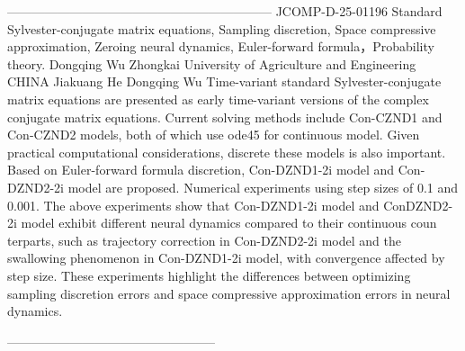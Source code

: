 ---------------------------------------------------------------
JCOMP-D-25-01196
Standard Sylvester-conjugate matrix equations, Sampling discretion, Space
compressive approximation, Zeroing
neural dynamics, Euler-forward formula，Probability theory.
Dongqing Wu
Zhongkai University of Agriculture and Engineering
CHINA
Jiakuang He
Dongqing Wu
Time-variant standard Sylvester-conjugate matrix equations are presented as early
time-variant versions of the complex conjugate matrix equations. Current solving
methods include Con-CZND1 and Con-CZND2 models, both of which use ode45 for
continuous model. Given practical computational considerations, discrete these models
is also important. Based on Euler-forward formula discretion, Con-DZND1-2i model
and Con-DZND2-2i model are proposed. Numerical experiments using step sizes of
0.1 and 0.001. The above experiments show that Con-DZND1-2i model and ConDZND2-2i model exhibit different neural dynamics compared to their continuous coun
terparts, such as trajectory correction in Con-DZND2-2i model and the swallowing
phenomenon in Con-DZND1-2i model, with convergence affected by step size. These
experiments highlight the differences between optimizing sampling discretion errors
and space compressive approximation errors in neural dynamics.

--------------------------------------------------

